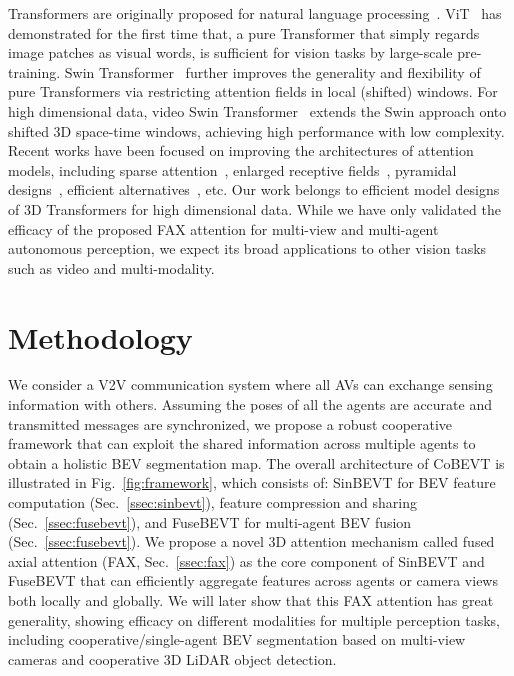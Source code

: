 \documentclass{article}
\begin{document}
Transformers are originally proposed for natural language processing~\cite{vaswani2017attention}.
%
ViT~\cite{dosovitskiy2020image} has demonstrated for the first time that, a pure Transformer that simply regards image patches as visual words, is sufficient for vision tasks by large-scale pre-training.
%
Swin Transformer~\cite{liu2021swin} further improves the generality and flexibility of pure Transformers via restricting attention fields in local (shifted) windows.
%
For high dimensional data, video Swin Transformer~\cite{liu2021video} extends the Swin approach onto shifted 3D space-time windows, achieving high performance with low complexity.
%
%
Recent works have been focused on improving the architectures of attention models, including sparse attention~\cite{dong2021cswin,yang2021focal,rao2021dynamicvit,wang2020axial, arnab2021vivit,tu2022maxim,li2021improved}, enlarged receptive fields~\cite{min2022peripheral,hatamizadeh2022global}, pyramidal designs~\cite{wang2021pyramid,fan2021multiscale,xu2021vitae},
efficient alternatives~\cite{ali2021xcit,liu2021pay,lee2021fnet}, etc.
%
Our work belongs to efficient model designs of 3D Transformers for high dimensional data. While we have only validated the efficacy of the proposed FAX attention for multi-view and multi-agent autonomous perception, we expect its broad applications to other vision tasks such as video and multi-modality.

\section{Methodology}
We consider a V2V communication system where all AVs can exchange sensing information with others.
%
Assuming the poses of all the agents are accurate and transmitted messages are synchronized, we propose a robust cooperative framework that can exploit the shared information across multiple agents to obtain a holistic BEV segmentation map.
%
The overall architecture of CoBEVT is illustrated in Fig.~\ref{fig:framework}, which consists of: SinBEVT for BEV feature computation (Sec.~\ref{ssec:sinbevt}), feature compression and sharing (Sec.~\ref{ssec:fusebevt}), and FuseBEVT for multi-agent BEV fusion (Sec.~\ref{ssec:fusebevt}).
%
We propose a novel 3D attention mechanism called fused axial attention (FAX, Sec.~\ref{ssec:fax}) as the core component of SinBEVT and FuseBEVT that can efficiently aggregate features across agents or camera views both locally and globally.
%
We will later show that this FAX attention has great generality, showing efficacy on different modalities for multiple perception tasks, including cooperative/single-agent BEV segmentation based on multi-view cameras and cooperative 3D LiDAR object detection.
%
\end{document}
